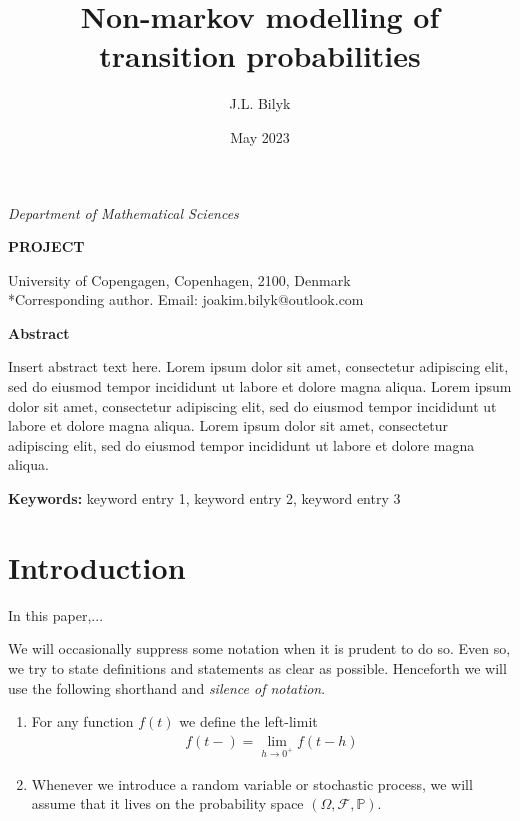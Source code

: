 \documentclass[12pt,letter,twoside]{article}
\title{Non-markov modelling of transition probabilities}
\author{J.L. Bilyk}
\date{May 2023}
\theoremstyle{plain}
\theoremstyle{definition}
\theoremstyle{remark}
\begin{document}
\pagestyle{fancy}
\fancyhead{} %
\fancyhead[LE]{\small\thepage\hspace{10pt} \Author}
\fancyfoot{} %
\renewcommand{\headrulewidth}{0pt}
\thispagestyle{empty}

{\footnotesize \textit{Department of Mathematical Sciences}}\vspace{15pt}

{\sffamily\bfseries\MakeUppercase{Project}}\vspace{15pt}

{\LARGE\sffamily\bfseries \Title}\vspace{15pt}

{\small\Author*}\vspace{7.5pt}

{\small
University of Copengagen, Copenhagen, 2100, Denmark\\\vspace{5pt}
*Corresponding author. Email: joakim.bilyk@outlook.com}

\begin{abstractbox}

{\small
\textbf{Abstract}\vspace{5pt}

Insert abstract text here. Lorem ipsum dolor sit amet, consectetur adipiscing elit, sed do eiusmod tempor incididunt ut labore et dolore magna aliqua. Lorem ipsum dolor sit amet, consectetur adipiscing elit, sed do eiusmod tempor incididunt ut labore et dolore magna aliqua. Lorem ipsum dolor sit amet, consectetur adipiscing elit, sed do eiusmod tempor incididunt ut labore et dolore magna aliqua.
}
\end{abstractbox}

{\small
\textbf{Keywords:} keyword entry 1, keyword entry 2, keyword entry 3
}

\section{Introduction}
In this paper,...

We will occasionally suppress some notation when it is prudent to do so. Even so, we try to state definitions and statements as clear as possible. Henceforth we will use the following shorthand and \textit{silence of notation}.
\begin{enumerate}
    \item For any function $f(t)$ we define the left-limit
    \begin{align}
        f(t-)=\lim_{h\to 0^+} f(t-h)
    \end{align}
    \item Whenever we introduce a random variable or stochastic process, we will assume that it lives on the probability space $(\Omega, \mathcal F,\mathbb P)$.
\end{enumerate}
\end{document}

